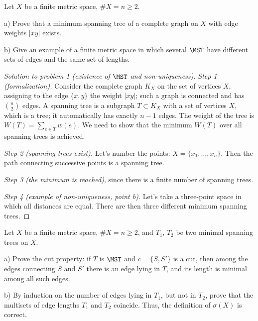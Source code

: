 \documentclass[a4paper,12pt]{report}
\begin{document}
\begin{task}
Let $X$ be a finite metric space, $\#X=n\ge2$.

\textup{a)} Prove that a minimum spanning tree of a complete graph on $X$ with edge weights $|xy|$ exists.

\textup{b)} Give an example of a finite metric space in which several $\MST$ have different sets of edges and the same set of lengths.

\end{task}

\begin{proof}[Solution to problem \textup{1} \textup{(}existence of $\MST$ and non-uniqueness\textup{)}]
\textit{Step \textup{1} \textup{(}formalization\textup{)}.} Consider the complete graph $K_X$ on the set of vertices $X$, assigning to the edge $\{x,y\}$ the weight $|xy|$\textup{;} such a graph is connected and has $\binom n2$ edges. A spanning tree is a subgraph $T\subset K_X$ with a set of vertices $X$, which is a tree\textup{;} it automatically has exactly $n-1$ edges. The weight of the tree is $W(T)=\sum_{e\in T}w(e)$. We need to show that the minimum $W(T)$ over all spanning trees is achieved.

\textit{Step \textup{2} \textup{(}spanning trees exist\textup{)}.} Let's number the points\textup{:} $X=\{x_1,\dots,x_n\}$. Then the path connecting successive points is a spanning tree.

\textit{Step \textup{3} \textup{(}the minimum is reached\textup{)}}, since there is a finite number of spanning trees.

\textit{Step \textup{4} \textup{(}example of non-uniqueness, point \textup{b}\textup{)}.} Let's take a three-point space in which all distances are equal. There are then three different minimum spanning trees.
\end{proof}

\begin{task}
Let $X$ be a finite metric space, $\#X=n\ge2$, and $T_1$, $T_2$ be two minimal spanning trees on $X$.

\textup{a)} Prove the cut property\textup{:} if $T$ is $\MST$ and $c=\{S,S'\}$ is a cut, then among the edges connecting $S$ and $S'$ there is an edge lying in $T$, and its length is minimal among all such edges.

\textup{b)} By induction on the number of edges lying in $T_1$, but not in $T_2$, prove that the multisets of edge lengths $T_1$ and $T_2$ coincide. Thus, the definition of $\sigma(X)$ is correct.
\end{task}
\end{document}
